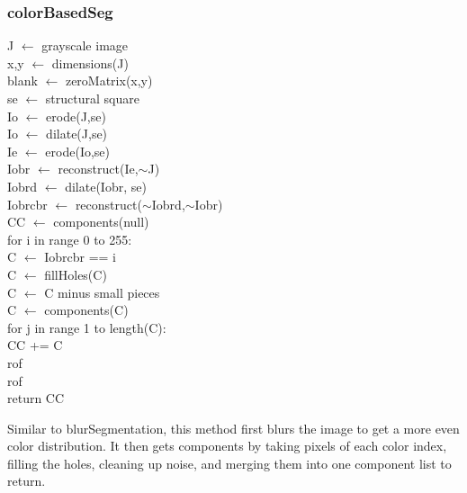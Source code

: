 \documentclass[12pt]{article}
\newcommand\tab[1][1cm]{\hspace*{#1}}
\begin{document}
\subsubsection*{colorBasedSeg}
\begin{addmargin}[12em]{1em}
	J $\leftarrow$ grayscale image \\
	x,y $\leftarrow$ dimensions(J) \\
	blank $\leftarrow$ zeroMatrix(x,y) \\
	se $\leftarrow$ structural square \\
	Io $\leftarrow$ erode(J,se) \\
	Io $\leftarrow$ dilate(J,se) \\
	Ie $\leftarrow$ erode(Io,se) \\
	Iobr $\leftarrow$ reconstruct(Ie,$\sim$J) \\
	Iobrd $\leftarrow$ dilate(Iobr, se) \\
	Iobrcbr $\leftarrow$ reconstruct($\sim$Iobrd,$\sim$Iobr) \\
	CC $\leftarrow$ components(null) \\
	for i in range 0 to 255: \\
	\tab C $\leftarrow$ Iobrcbr == i \\
	\tab C $\leftarrow$ fillHoles(C) \\
	\tab C $\leftarrow$ C minus small pieces \\
	\tab C $\leftarrow$ components(C) \\
	\tab for j in range 1 to length(C): \\
	\tab\tab CC += C \\
	\tab rof \\
	rof \\
	return CC \\	
\end{addmargin}
Similar to blurSegmentation, this method first blurs the image to get a more even color distribution. It then gets components by taking pixels of each color index, filling the holes, cleaning up noise, and merging them into one component list to return.
\end{document}
